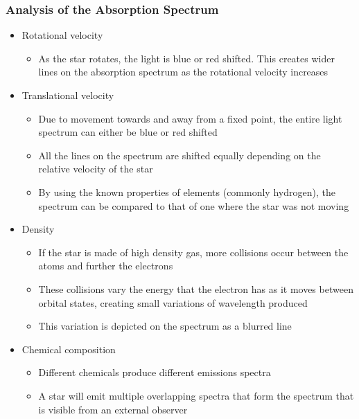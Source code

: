 		\subsubsection{Analysis of the Absorption Spectrum}
		
			\begin{itemize}
				\item Rotational velocity
					\begin{itemize}
						\item As the star rotates, the light is blue or red shifted. This creates wider lines on the absorption spectrum as the rotational velocity increases
					\end{itemize}

				\item Translational velocity
					\begin{itemize}
						\item Due to movement towards and away from a fixed point, the entire light spectrum can either be blue or red shifted
						\item All the lines on the spectrum are shifted equally depending on the relative velocity of the star
						\item By using the known properties of elements (commonly hydrogen), the spectrum can be compared to that of one where the star was not moving
					\end{itemize}

				\item Density
					\begin{itemize}
						\item If the star is made of high density gas, more collisions occur between the atoms and further the electrons
						\item These collisions vary the energy that the electron has as it moves between orbital states, creating small variations of wavelength produced
						\item This variation is depicted on the spectrum as a blurred line
					\end{itemize}
				
				\item Chemical composition
					\begin{itemize}
						\item Different chemicals produce different emissions spectra
						\item A star will emit multiple overlapping spectra that form the spectrum that is visible from an external observer
					\end{itemize}
			\end{itemize}

